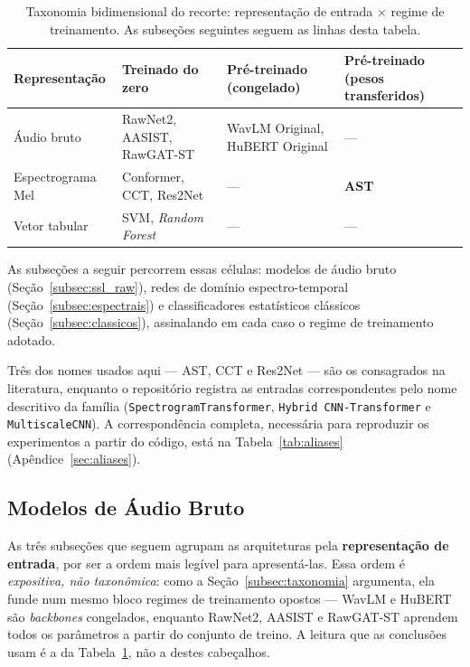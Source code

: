 \documentclass[12pt,a4paper]{article}
\begin{document}
\begin{table}[H]
	\centering
	\caption[Taxonomia do recorte por representação e regime de treinamento.]{Taxonomia bidimensional do recorte: representação de entrada
		$\times$ regime de treinamento. As subseções seguintes seguem as linhas desta
		tabela.}
	\label{tab:taxonomia_2d}
	\small\singlespacing
	\setlength{\tabcolsep}{4pt}
	\begin{tabular}{@{}>{\raggedright\arraybackslash}p{3.0cm}
			>{\raggedright\arraybackslash}p{3.9cm}
			>{\raggedright\arraybackslash}p{3.7cm}
			>{\raggedright\arraybackslash}p{3.6cm}@{}}
		\toprule
		\textbf{Representação} & \textbf{Treinado do zero} &
		\textbf{Pré-treinado (congelado)} & \textbf{Pré-treinado (pesos transferidos)} \\
		\midrule
		Áudio bruto & RawNet2, AASIST, RawGAT-ST & WavLM Original, HuBERT Original & --- \\
		\addlinespace
		Espectrograma Mel & Conformer, CCT, Res2Net & --- & \textbf{AST} \\
		\addlinespace
		Vetor tabular & SVM, \textit{Random Forest} & --- & --- \\
		\bottomrule
	\end{tabular}
\end{table}

\noindent
As subseções a seguir percorrem essas células: modelos de áudio bruto
(Seção~\ref{subsec:ssl_raw}), redes de domínio espectro-temporal
(Seção~\ref{subsec:espectrais}) e classificadores estatísticos clássicos
(Seção~\ref{subsec:classicos}), assinalando em cada caso o regime de
treinamento adotado.

Três dos nomes usados aqui --- AST, CCT e Res2Net --- são os consagrados na
literatura, enquanto o repositório registra as entradas correspondentes pelo
nome descritivo da família (\texttt{SpectrogramTransformer},
\texttt{Hybrid CNN-Transformer} e \texttt{MultiscaleCNN}). A correspondência
completa, necessária para reproduzir os experimentos a partir do código, está
na Tabela~\ref{tab:aliases} (Apêndice~\ref{sec:aliases}).

\subsection{Modelos de Áudio Bruto}

As três subseções que seguem agrupam as arquiteturas pela \textbf{representação
	de entrada}, por ser a ordem mais legível para apresentá-las. Essa ordem é
\emph{expositiva, não taxonômica}: como a Seção~\ref{subsec:taxonomia}
argumenta, ela funde num mesmo bloco regimes de treinamento opostos --- WavLM e
HuBERT são \textit{backbones} congelados, enquanto RawNet2, AASIST e RawGAT-ST
aprendem todos os parâmetros a partir do conjunto de treino. A leitura que as
conclusões usam é a da Tabela~\ref{tab:taxonomia_2d}, não a destes
cabeçalhos.
\label{subsec:ssl_raw}
\end{document}
